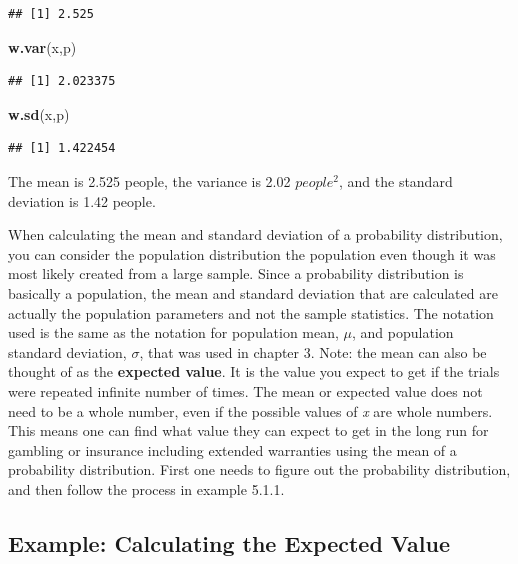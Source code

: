 \documentclass[
]{book}
\newenvironment{Shaded}{\begin{snugshade}}{\end{snugshade}}
\newcommand{\KeywordTok}[1]{\textcolor[rgb]{0.13,0.29,0.53}{\textbf{#1}}}
\newcommand{\NormalTok}[1]{#1}
\begin{document}
\begin{verbatim}
## [1] 2.525
\end{verbatim}

\begin{Shaded}
\begin{Highlighting}[]
\KeywordTok{w.var}\NormalTok{(x,p)}
\end{Highlighting}
\end{Shaded}

\begin{verbatim}
## [1] 2.023375
\end{verbatim}

\begin{Shaded}
\begin{Highlighting}[]
\KeywordTok{w.sd}\NormalTok{(x,p)}
\end{Highlighting}
\end{Shaded}

\begin{verbatim}
## [1] 1.422454
\end{verbatim}

The mean is 2.525 people, the variance is 2.02 \(people^2\), and the standard deviation is 1.42 people.

When calculating the mean and standard deviation of a probability distribution, you can consider the population distribution the population even though it was most likely created from a large sample. Since a probability distribution is basically a population, the mean and standard deviation that are calculated are actually the population parameters and not the sample statistics. The notation used is the same as the notation for population mean, \(\mu\), and population standard deviation, \(\sigma\), that was used in chapter 3. Note: the mean can also be thought of as the \textbf{expected value}. It is the value you expect to get if the trials were repeated infinite number of times. The mean or expected value does not need to be a whole number, even if the possible values of \emph{x} are whole numbers. This means one can find what value they can expect to get in the long run for gambling or insurance including extended warranties using the mean of a probability distribution. First one needs to figure out the probability distribution, and then follow the process in example 5.1.1.

\hypertarget{example-calculating-the-expected-value}{%
\subsection{Example: Calculating the Expected Value}\label{example-calculating-the-expected-value}}
\end{document}
